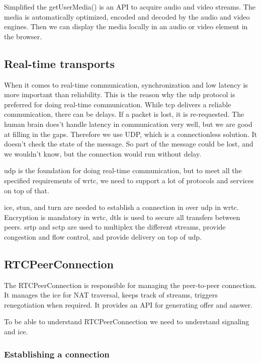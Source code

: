 Simplified the getUserMedia() is an API to acquire audio and video streams. The media is automatically optimized, encoded and decoded by the audio and video engines. Then we can display the media locally in an audio or video element in the browser.


\subsection{Real-time transports}
When it comes to real-time communication, synchronization and low latency is more important than reliability. This is the reason why the \gls{udp} protocol is preferred for doing real-time communication. While \gls{tcp} delivers a reliable communication, there can be delays. If a packet is lost, it is re-requested. The human brain does't handle latency in communication very well, but we are good at filling in the gaps. Therefore we use UDP, which is a connectionless solution. It doesn't check the state of the message. So part of the message could be lost, and we wouldn't know, but the connection would run without delay.

\gls{udp} is the foundation for doing real-time communication, but to meet all the specified requirements of \gls{wrtc}, we need to support a lot of protocols and services on top of that.

\gls{ice}, \gls{stun}, and \gls{turn} are needed to establish a connection in over \gls{udp} in \gls{wrtc}. Encryption is mandatory in \gls{wrtc}, \gls{dtls} is used to secure all transfers between peers. \gls{srtp} and \gls{sctp} are used to multiplex the different streams, provide congestion and flow control, and provide delivery on top of \gls{udp}.

\subsection{RTCPeerConnection}
The RTCPeerConnection is responsible for managing the peer-to-peer connection. It manages the \gls{ice} for NAT traversal, keeps track of streams, triggers renegotiation when required. It provides an API for generating offer and answer.

To be able to understand RTCPeerConnection we need to understand signaling and \gls{ice}.

\subsubsection{Establishing a connection}

